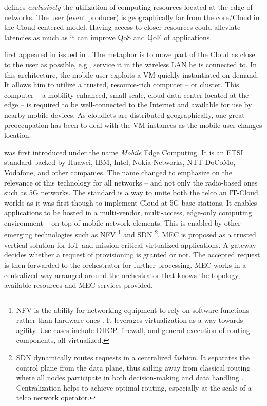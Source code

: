 \documentclass[11pt]{sdm}
\begin{document}
\begin{description}[leftmargin=10pt]
	\item[Edge Computing] defines \emph{exclusively} the utilization of computing resources located at the edge of networks. The user (event producer) is geographically far from the core/Cloud in the Cloud-centered model. Having access to closer resources could alleviate latencies as much as it can improve \gls{QoS} and \gls{QoE} of applications.

	\item[Cloudlets] first appeared in \cite{satyanarayanan_case_2009} issued in . The metaphor is to move part of the Cloud as close to the user as possible, e.g., service it in the wireless LAN he is connected to. In this architecture, the mobile user exploits a \gls{VM} quickly instantiated on demand. It allows him to utilize a trusted, resource-rich computer -- or cluster. This computer -- a mobility enhanced, small-scale, cloud data-center located at the edge -- is required to be well-connected to the Internet and available for use by nearby mobile devices. As cloudlets are distributed geographically, one great preoccupation has been to deal with the \gls{VM} instances as the mobile user changes location.

	\item[\acrfull{MEC}] was first introduced under the name \emph{Mobile} Edge Computing. It is an \gls{ETSI} standard backed by Huawei, IBM, Intel, Nokia Networks, NTT DoCoMo, Vodafone, and other companies. The name changed to emphasize on the relevance of this technology for all networks -- and not only the radio-based ones such as 5G networks. The standard is a way to unite both the telco an IT-Cloud worlds \cite{dahmen-lhuissier_etsi_nodate-1} as it was first though to implement Cloud at 5G base stations. It enables applications to be hosted in a multi-vendor, multi-access, edge-only computing environment -- on-top of mobile network elements. This is enabled by other emerging technologies such as \gls{NFV} \footnote{\acrfull{NFV} is the ability for networking equipment to rely on software functions rather than hardware ones \cite{redhat_what_2019}. It leverages virtualization as a way towards agility. Use cases include DHCP, firewall, and general execution of routing components, all virtualized.} and \gls{SDN} \footnote{\acrfull{SDN} dynamically routes requests in a centralized fashion. It separates the control plane from the data plane, thus sailing away from classical routing where all nodes participate in both decision-making and data handling \cite{redhat_what_2019}. Centralization helps to achieve optimal routing, especially at the scale of a telco network operator.}. \gls{MEC} is proposed as a trusted vertical solution for \gls{IoT} and mission critical virtualized applications.
	A gateway decides whether a request of provisioning is granted or not. The accepted request is then forwarded to the orchestrator for further processing. \gls{MEC} works in a centralized way arranged around the orchestrator that knows the topology, available resources and \gls{MEC} services provided.


\end{description}
\end{document}
